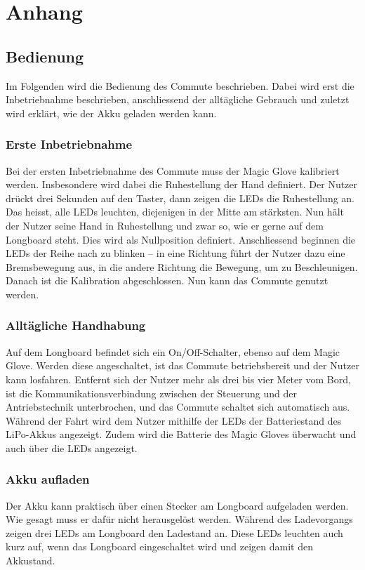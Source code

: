 \chapter{Anhang}\label{chp:Anhang}


\section{Bedienung}
Im Folgenden wird die Bedienung des Commute beschrieben. Dabei wird erst die Inbetriebnahme beschrieben, anschliessend der alltägliche Gebrauch und zuletzt wird erklärt, wie der Akku geladen werden kann.
\subsection*{Erste Inbetriebnahme}
Bei der ersten Inbetriebnahme des Commute muss der Magic Glove kalibriert werden. Insbesondere wird dabei die Ruhestellung der Hand definiert. Der Nutzer drückt drei Sekunden auf den Taster, dann zeigen die LEDs die Ruhestellung an. Das heisst, alle LEDs leuchten, diejenigen in der Mitte am stärksten. Nun hält der Nutzer seine Hand in Ruhestellung und zwar so, wie er gerne auf dem Longboard steht. Dies wird als Nullposition definiert. Anschliessend beginnen die LEDs der Reihe nach zu blinken – in eine Richtung führt der Nutzer dazu eine Bremsbewegung aus, in die andere Richtung die Bewegung, um zu Beschleunigen. Danach ist die Kalibration abgeschlossen. Nun kann das Commute genutzt werden.
\subsection*{Alltägliche Handhabung}
Auf dem Longboard befindet sich ein On/Off-Schalter, ebenso auf dem Magic Glove. Werden diese angeschaltet, ist das Commute betriebsbereit und der Nutzer kann losfahren. 
Entfernt sich der Nutzer mehr als drei bis vier Meter vom Bord, ist die Kommunikationsverbindung zwischen der Steuerung und der Antriebstechnik unterbrochen, und das Commute schaltet sich automatisch aus. Während der Fahrt wird dem Nutzer mithilfe der LEDs der Batteriestand des LiPo-Akkus angezeigt. Zudem wird die Batterie des Magic Gloves überwacht und auch über die LEDs angezeigt. 
\subsection*{Akku aufladen}
Der Akku kann praktisch über einen Stecker am Longboard aufgeladen werden. Wie gesagt muss er dafür nicht herausgelöst werden. Während des Ladevorgangs zeigen drei LEDs am Longboard den Ladestand an. Diese LEDs leuchten auch kurz auf, wenn das Longboard eingeschaltet wird und zeigen damit den Akkustand. 
